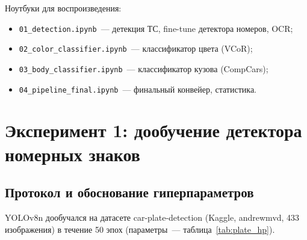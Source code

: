 \documentclass[14pt,a4paper]{report}
\numberwithin{equation}{chapter}
\numberwithin{figure}{chapter}
\numberwithin{table}{chapter}
\begin{document}
Ноутбуки для воспроизведения:
\begin{itemize}[nosep]
  \item \texttt{01\_detection.ipynb}~--- детекция ТС, fine-tune детектора номеров, OCR;
  \item \texttt{02\_color\_classifier.ipynb}~--- классификатор цвета (VCoR);
  \item \texttt{03\_body\_classifier.ipynb}~--- классификатор кузова (CompCars);
  \item \texttt{04\_pipeline\_final.ipynb}~--- финальный конвейер, статистика.
\end{itemize}

\section{Эксперимент 1: дообучение детектора номерных знаков}

\subsection{Протокол и обоснование гиперпараметров}

YOLOv8n дообучался на датасете car-plate-detection (Kaggle, andrewmvd, 433 изображения) в течение 50 эпох
(параметры~--- таблица~\ref{tab:plate_hp}).
\end{document}
